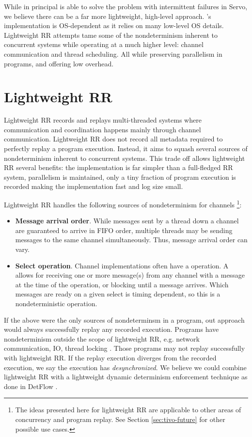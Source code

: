 While in principal  is able to solve the problem with intermittent failures in Servo,
we believe there can be a far more lightweight, high-level approach.
's implementation is OS-dependent as it relies on many low-level OS details.
Lightweight RR attempts tame some of the nondeterminism inherent to concurrent systems
while operating at a much higher level: channel communication and thread scheduling.
All while preserving parallelism in programs, and offering low overhead.

\section{Lightweight RR}
Lightweight RR records and replays multi-threaded systems
where communication and coordination happens mainly through channel communication.
Lightweight RR does not record all metadata required to perfectly replay a program execution. Instead, it aims to squash several sources of nondeterminism inherent to concurrent systems. This trade off allows lightweight RR several benefits: the implementation is far simpler than
a full-fledged RR system, parallelism is maintained, only a tiny fraction of program
execution is recorded making the implementation fast and log size small.

Lightweight RR handles the following sources of nondeterminism for channels \footnote{The ideas presented here for lightweight RR are applicable to other areas of concurrency and program replay. See Section \ref{sec:tivo-future} for other possible use cases.}:
\begin{itemize}
\item \textbf{Message arrival order}. While messages sent by a thread down a channel are guaranteed to arrive in FIFO order, multiple threads may be sending messages to the same channel simultaneously. Thus, message arrival order can vary.
\item \textbf{Select operation}. Channel implementations often have a  operation. A  allows for receiving one or more message(s) from any channel with a message at the time of the operation, or blocking until a message arrives. Which messages are ready on a given select is timing dependent, so this is a nondeterministic operation.
\end{itemize}

If the above were the only sources of nondeterminsm in a program, out approach would always successfully replay any recorded execution. Programs have nondeterminism outside the scope of lightweight RR, e.g. network communication, IO, thread locking \cite{dettrace}. Those programs may not replay successfully with lightweight RR. If the replay execution diverges from the recorded execution, we say the execution has \textit{desynchronized}. We believe we could combine lightweight RR with a lightweight dynamic determinism enforcement technique as done in DetFlow \cite{detflow}. 

